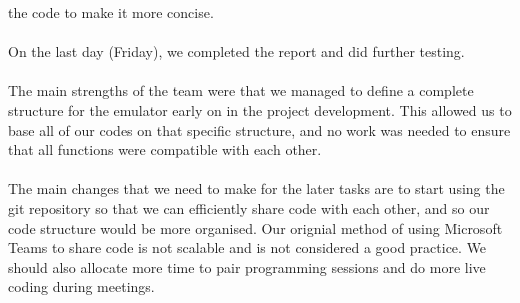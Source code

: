 \documentclass[11pt]{article}
\begin{document}
the code to make it more concise.
\\~\\On the last day (Friday), we completed the report and did further testing.
\\~\\The main strengths of the team were that we managed to define a complete structure for the emulator
early on in the project development. This allowed us to base all of our codes on that specific structure,
and no work was needed to ensure that all functions were compatible with each other.
\\~\\The main changes that we need to make for the later tasks are to start using the git repository so
that we can efficiently share code with each other, and so our code structure would be more organised.
Our orignial method of using Microsoft Teams to share code is not scalable and is not considered a good
practice. We should also allocate more time to pair programming sessions and do more live coding during
meetings.
\end{document}
